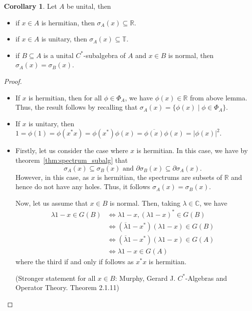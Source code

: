 \documentclass[]{article}
\theoremstyle{definition}
\newtheorem{corollary}{Corollary}[theorem]
\begin{document}
\begin{corollary}
  Let \(A\) be unital, then 
  \begin{itemize}
    \item if \(x \in A\) is hermitian, then \(\sigma_A(x) \subseteq \mathbb{R}\).
    \item if \(x \in A\) is unitary, then \(\sigma_A(x) \subseteq \mathbb{T}\).
    \item if \(B \subseteq A\) is a unital \(C^*\)-subalgebra of \(A\) and \(x \in B\) is normal, then 
      \(\sigma_A(x) = \sigma_B(x)\).
  \end{itemize}
\end{corollary}
\begin{proof}\(\)\\
  \begin{itemize}
    \item If \(x\) is hermitian, then for all \(\phi \in \Phi_A\), we have \(\phi(x) \in \mathbb{R}\) 
      from above lemma. Thus, the result follows by recalling that \(\sigma_A(x) = \{\phi(x) \mid \phi \in \Phi_A\}\).
    \item If \(x\) is unitary, then \(1 = \phi(1) = \phi(x^*x) = \phi(x^*)\phi(x) = \overline{\phi(x)}\phi(x) = |\phi(x)|^2\).
    \item Firstly, let us consider the case where \(x\) is hermitian. In this case, we have by 
    theorem~\ref{thm:spectrum_subalg} that 
    \[\sigma_A(x) \subseteq \sigma_B(x) \text{ and } \partial \sigma_B(x) \subseteq \partial \sigma_A(x).\]
    However, in this case, as \(x\) is hermitian, the spectrums are subsets of \(\mathbb{R}\) and hence do 
    not have any holes. Thus, it follows \(\sigma_A(x) = \sigma_B(x)\).

    Now, let us assume that \(x \in B\) is normal. Then, taking \(\lambda \in \mathbb{C}\), we have
    \begin{align*}
      \lambda 1 - x \in G(B) & \iff \lambda 1 - x, (\lambda 1 - x)^* \in G(B)\\
      & \iff (\overline{\lambda} 1 - x^*)(\lambda 1 - x) \in G(B)\\
      & \iff (\overline{\lambda} 1 - x^*)(\lambda 1 - x) \in G(A)\\
      & \iff \lambda 1 - x \in G(A)
    \end{align*}
    where the third if and only if follows as \(x^* x\) is hermitian.

    (Stronger statement for all \(x \in B\): Murphy, Gerard J. \(C^*\)-Algebras and Operator Theory. Theorem 2.1.11)  
  \end{itemize}
\end{proof}
\end{document}
